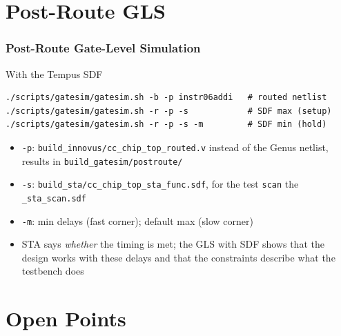 \documentclass{beamer}
\newcommand{\astitle}{nix}
\newcommand{\assubtitle}{nix}
\newcommand{\cmd}[1]{\texttt{#1}}
\begin{document}
\section{Post-Route GLS}
\renewcommand{\astitle}{Post-Route Gate-Level Simulation}

\renewcommand{\assubtitle}{With the Tempus SDF}
\begin{frame}[fragile]
\frametitle{\astitle}
\begin{block}{\assubtitle}
\begin{lstlisting}[style=sh]
./scripts/gatesim/gatesim.sh -b -p instr06addi   # routed netlist
./scripts/gatesim/gatesim.sh -r -p -s            # SDF max (setup)
./scripts/gatesim/gatesim.sh -r -p -s -m         # SDF min (hold)
\end{lstlisting}
  \begin{itemize}
    \item \cmd{-p}: \cmd{build\_innovus/cc\_chip\_top\_routed.v} instead
      of the Genus netlist, results in \cmd{build\_gatesim/postroute/}
    \item \cmd{-s}: \cmd{build\_sta/cc\_chip\_top\_sta\_func.sdf}, for the
      test \cmd{scan} the \cmd{\_sta\_scan.sdf}
    \item \cmd{-m}: min delays (fast corner); default max (slow corner)
    \item STA says \emph{whether} the timing is met; the GLS with SDF
      shows that the design works with these delays and that the
      constraints describe what the testbench does
  \end{itemize}
\end{block}
\end{frame}

\section{Open Points}
\renewcommand{\astitle}{Open Points}
\end{document}
